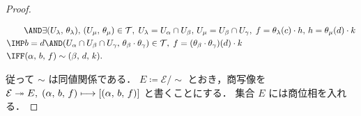 \documentclass[algtopo_main]{subfiles}
\begin{document}
\begin{proof}
\begin{description}
\begin{align}
            &\qquad \AND \exists (U_\lambda,\, \theta_\lambda),\,(U_\mu,\, \theta_\mu) \in \mathcal{T},\;  U_\lambda = U_\alpha \cap U_\beta,\, U_\mu = U_\beta \cap U_\gamma,\; f = \theta_\lambda (c) \cdot h,\, h = \theta_\mu (d) \cdot k \\
            &\IMP b = d \AND (U_\alpha \cap U_\beta \cap U_\gamma,\, \theta_\beta \cdot \theta_\gamma) \in \mathcal{T},\; f = (\theta_\beta \cdot \theta_\gamma)(d) \cdot k \\
            &\IFF (\alpha,\, b,\, f) \sim (\beta,\, d,\, k).
        \end{align}
    \end{description}
    従って $\sim$ は同値関係である．
	$E \coloneqq \mathcal{E}/{\sim}$ とおき，商写像を $\mathcal{E} \twoheadrightarrow E,\; (\alpha,\, b,\, f)  \longmapsto [ (\alpha,\, b,\, f)]$ と書くことにする．
	集合 $E$ には商位相を入れる．
	

\end{proof}
\end{document}

